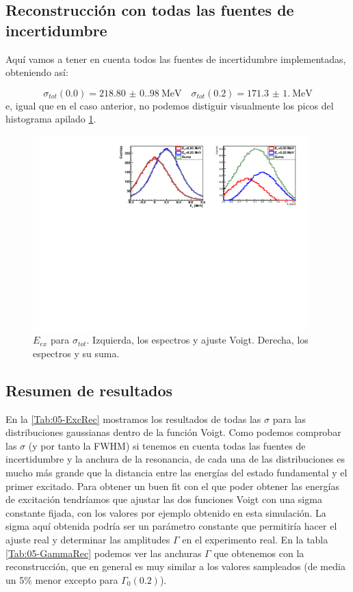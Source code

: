 \subsection{Reconstrucción con todas las fuentes de incertidumbre}

Aquí vamos a tener en cuenta todos las fuentes de incertidumbre implementadas, obteniendo así: 

\begin{equation}
    \sigma_{tot}(0.0) =\num{218.80(0.98)} \ \text{MeV} \quad 
    \sigma_{tot}(0.2) = \num{171.3(1.0)} \ \text{MeV}
\end{equation} 
e, igual que en el caso anterior, no podemos distiguir visualmente los picos del histograma apilado \cref{Fig:05-RecExcIdx0}. 

\begin{figure}[H]
    \centering
    \includegraphics[width=0.95\textwidth]{Imagenes/Rec_incIdx0_single.pdf}
    \caption{$E_{ex}$ para $\sigma_{tot}$. Izquierda, los espectros y ajuste Voigt. Derecha, los espectros y su suma.}
    \label{Fig:05-RecExcIdx0}
\end{figure}


\subsection{Resumen de resultados}

En la \cref{Tab:05-ExcRec} mostramos los resultados de todas las $\sigma$ para las distribuciones gaussianas dentro de la función Voigt. Como podemos comprobar las $\sigma$ (y por tanto la FWHM)  si tenemos en cuenta todas las fuentes de incertidumbre y la anchura de la resonancia, de cada una de las distribuciones es mucho más grande que la distancia entre las energías del estado fundamental y el primer excitado. Para obtener un buen fit con el que poder obtener las energías de excitación tendríamos que ajustar las dos funciones Voigt con una sigma constante fijada, con los valores por ejemplo obtenido en esta simulación. La sigma aquí obtenida podría ser un parámetro constante que permitiría hacer el ajuste real y determinar las amplitudes $\Gamma$ en el experimento real. En la tabla \cref{Tab:05-GammaRec} podemos ver las anchuras $\Gamma$ que obtenemos con la reconstrucción, que en general es muy similar a los valores sampleados (de media un 5\% menor excepto para $\Gamma_0(0.2)$).  

